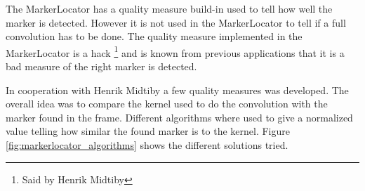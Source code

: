 The MarkerLocator has a quality measure build-in used to tell how well the marker is detected. However it is not used in the MarkerLocator to tell if a full convolution has to be done. 
The quality measure implemented in the MarkerLocator is a hack \footnote{Said by Henrik Midtiby} and is known from previous applications that it is a bad measure of the right marker is detected.

In cooperation with Henrik Midtiby a few quality measures was developed. The overall idea was to compare the kernel used to do the convolution with the marker found in the frame.
Different algorithms where used to give a normalized value telling how similar the found marker is to the kernel. Figure \ref{fig:markerlocator_algorithms} shows the different solutions tried.\\

